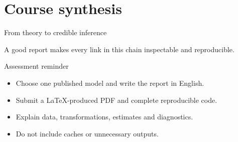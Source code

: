 \documentclass[aspectratio=169,10pt]{beamer}
\begin{document}
\section{Course synthesis}
\begin{frame}{From theory to credible inference}\centering{}
\vfill A good report makes every link in this chain inspectable and reproducible.\end{frame}
\begin{frame}{Assessment reminder}\begin{itemize}\item Choose one published model and write the report in English.\item Submit a LaTeX-produced PDF and complete reproducible code.\item Explain data, transformations, estimates and diagnostics.\item Do not include caches or unnecessary outputs.\end{itemize}\vfill\centering\Large{}\end{frame}
\end{document}
